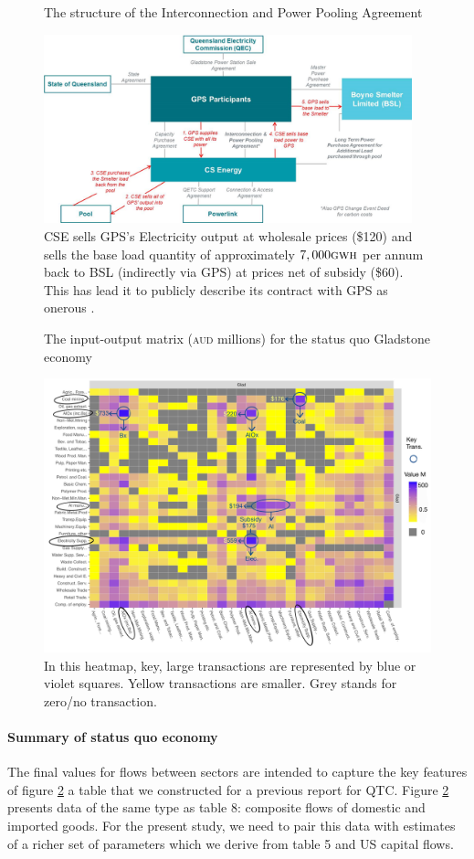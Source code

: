 \documentclass[12pt,a4paper]{article}
\begin{document}
\begin{figure}[H] \caption{  \label{fig-Bx-ratio} The structure of the
  Interconnection and Power Pooling Agreement}
  \includegraphics[width=0.95\textwidth]{./ippa.png} \vskip5pt
  \caption*{\footnotesize CSE sells GPS's Electricity output at wholesale
  prices (\$120) and sells the base load quantity of approximately
  $7,000\textsc{gwh}$ per annum back to BSL (indirectly via GPS) at prices net
  of subsidy (\$60). This has lead it to publicly describe its contract with
  GPS as onerous \cite{CSE}.} \end{figure}
\begin{figure}[H]
    \caption{\label{fig-heatAcomp} The input-output matrix (\textsc{aud}
    millions) for the status quo Gladstone economy}
  \includegraphics[width=.95\textwidth]{./heatZvalcomp-ann.jpg} \caption*{
    In this heatmap, key, large transactions are represented by blue or violet
    squares. Yellow transactions are smaller. Grey stands for zero/no
    transaction.  }
\end{figure}

\paragraph{Summary of status quo economy} The final values for flows between
sectors are intended to capture the key features of figure \ref{fig-heatAcomp}
a table that we constructed for a previous report for QTC. Figure
\ref{fig-heatAcomp} presents data of the same type as table 8: composite flows
of domestic and imported goods.  For the present study, we need to pair this
data with estimates of a richer set of parameters which we derive from table 5
and US capital flows.
\end{document}
